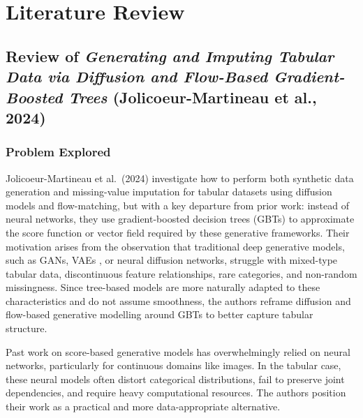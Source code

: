 \section{Literature Review}
\subsection[ForestFlow (Jolicoeur-Martineau et al., 2024)]{Review of \textit{Generating and Imputing Tabular Data via Diffusion and Flow-Based Gradient-Boosted Trees} (Jolicoeur-Martineau et al., 2024)}
\subsubsection{Problem Explored}
Jolicoeur-Martineau et al.\ (2024) investigate how to perform both synthetic data generation and missing-value imputation for tabular datasets using diffusion models and flow-matching, but with a key departure from prior work: instead of neural networks, they use gradient-boosted decision trees (GBTs) to approximate the score function or vector field required by these generative frameworks. Their motivation arises from the observation that traditional deep generative models, such as GANs, VAEs \cite{xu2019ctgan}, or neural diffusion networks, struggle with mixed-type tabular data, discontinuous feature relationships, rare categories, and non-random missingness. Since tree-based models are more naturally adapted to these characteristics and do not assume smoothness, the authors reframe diffusion and flow-based generative modelling around GBTs to better capture tabular structure.

Past work on score-based generative models has overwhelmingly relied on neural networks, particularly for continuous domains like images. In the tabular case, these neural models often distort categorical distributions, fail to preserve joint dependencies, and require heavy computational resources. The authors position their work as a practical and more data-appropriate alternative.

